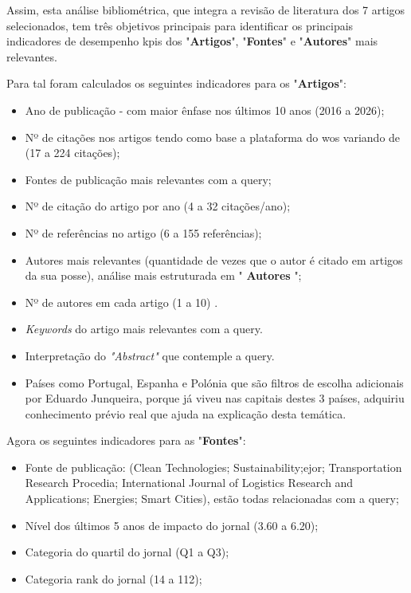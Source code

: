 Assim, esta análise bibliométrica, que integra a revisão de literatura dos 7 artigos selecionados, tem três objetivos principais para identificar os principais indicadores de desempenho \gls{kpi}s dos "\textbf{Artigos}", "\textbf{Fontes}" e "\textbf{Autores}" mais relevantes.

Para tal foram calculados os seguintes indicadores para os "\textbf{Artigos}":
\begin{itemize}
    \item Ano de publicação - com maior ênfase nos últimos 10 anos (2016 a 2026);
    \item Nº de citações nos artigos tendo como base a plataforma do \gls{wos} variando de (17 a 224 citações);
    \item Fontes de publicação mais relevantes com a \gls{query};
    \item Nº de citação do artigo por ano (4 a 32 citações/ano);
    \item Nº de referências no artigo (6 a 155 referências);
    \item Autores mais relevantes (quantidade de vezes que o autor é citado em artigos da sua posse), análise mais estruturada em "\textbf{ Autores }";
    \item Nº de autores em cada artigo (1 a 10) .
    \item \textit{Keywords} do artigo mais relevantes com a \gls{query}.
    \item Interpretação do \textit{"Abstract"} que contemple a \gls{query}.
    \item Países como Portugal, Espanha e Polónia que são filtros de escolha adicionais por Eduardo Junqueira, porque já viveu nas capitais destes 3 países, adquiriu conhecimento prévio real que ajuda na explicação desta temática.
\end{itemize}

Agora os seguintes indicadores para as "\textbf{Fontes}":
\begin{itemize}
    \item Fonte de publicação: (Clean Technologies; Sustainability;\gls{ejor};
Transportation Research Procedia;
International Journal of Logistics Research and Applications;
Energies;
Smart Cities), estão todas relacionadas com a \gls{query};
    \item Nível dos últimos 5 anos de impacto do jornal (3.60 a 6.20);
    \item Categoria do quartil do jornal (Q1 a Q3);
    \item Categoria rank do jornal (14 a 112);
 \end{itemize}

